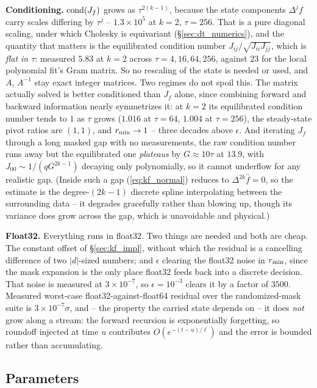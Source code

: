 \documentclass{article}
\numberwithin{equation}{section}   %
\begin{document}
{\bf Conditioning.}  ${\rm cond}(J_f)$ grows as $\tau^{2(k-1)}$, because the state components $\Delta^jf$
carry scales differing by $\tau^j$ -- $1.3\times10^5$ at $k=2$, $\tau=256$.  That is a pure diagonal scaling,
under which Cholesky is equivariant (\S\ref{sec:dt_numerics}), and the quantity that matters is the
equilibrated condition number
$J_{ij}/\sqrt{J_{ii}J_{jj}}$, which is {\em flat in $\tau$}: measured $5.83$ at $k=2$ across
$\tau = 4, 16, 64, 256$, against $23$ for the local polynomial fit's Gram matrix.  So no rescaling of the
state is needed or used, and $A$, $A^{-1}$ stay exact integer matrices.  Two regimes do not spoil this.  The
matrix actually solved is better conditioned than $J_f$ alone, since combining forward and backward
information nearly symmetrizes it: at $k=2$ its equilibrated condition number tends to $1$ as $\tau$ grows
($1.016$ at $\tau=64$, $1.004$ at $\tau=256$), the steady-state pivot ratios are $(1,1)$, and
$r_{\rm min} \rightarrow 1$ -- three decades above $\epsilon$.  And iterating $J_f$
through a long masked gap with no measurements, the raw condition number runs away but the equilibrated one
{\em plateaus} by $G \approx 10\tau$ at $13.9$, with $J_{00} \sim 1/(qG^{2k-1})$ decaying only polynomially,
so it cannot underflow for any realistic gap.  (Inside such a gap (\ref{eq:kf_normal}) reduces to
$\Delta^{2k}\hat f = 0$, so the estimate is the degree-$(2k{-}1)$ discrete spline interpolating between the
surrounding data -- it degrades gracefully rather than blowing up, though its variance does grow across the
gap, which is unavoidable and physical.)

{\bf Float32.}  Everything runs in float32.  Two things are needed and both are cheap.  The constant offset of
\S\ref{sec:kf_impl}, without which the residual is a cancelling difference of two $|d|$-sized numbers; and
$\epsilon$ clearing the float32 noise in $r_{\rm min}$, since the mask expansion is the only place float32
feeds back into a discrete decision.  That noise is measured at $3\times10^{-7}$, so $\epsilon = 10^{-3}$
clears it by a factor of $3500$.  Measured worst-case float32-against-float64 residual over the
randomized-mask suite is $3\times10^{-7}\sigma$, and -- the property the carried state depends on -- it does
{\em not} grow along a stream: the forward recursion is exponentially forgetting, so roundoff injected at time
$u$ contributes $O(e^{-(t-u)/\ell})$ and the error is bounded rather than accumulating.

\subsection{Parameters}
\label{sec:kf_params}
\end{document}
